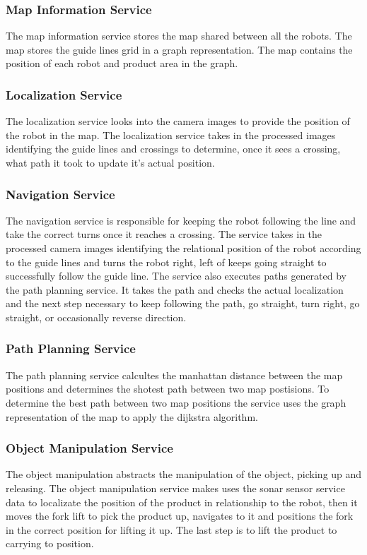 \subsubsection*{Map Information Service}
The map information service stores the map shared between all the robots. The map stores the guide lines grid in a graph representation. The map contains the position of each robot and product area in the graph.

\subsubsection*{Localization Service}
The localization service looks into the camera images to provide the position of the robot in the map. The localization service takes in the processed images identifying the guide lines and crossings to determine, once it sees a crossing, what path it took to update it's actual position.

\subsubsection*{Navigation Service}
The navigation service is responsible for keeping the robot following the line and take the correct turns once it reaches a crossing. The service takes in the processed camera images identifying the relational position of the robot according to the guide lines and turns the robot right, left of keeps going straight to successfully follow the guide line. The service also executes paths generated by the path planning service. It takes the path and checks the actual localization and the next step necessary to keep following the path, go straight, turn right, go straight, or occasionally reverse direction.

\subsubsection*{Path Planning Service}
The path planning service calcultes the manhattan distance between the map positions and determines the shotest path between two map postisions. To determine the best path between two map positions the service uses the graph representation of the map to apply the dijkstra algorithm.

\subsubsection*{Object Manipulation Service}
The object manipulation abstracts the manipulation of the object, picking up and releasing. The object manipulation service makes uses the sonar sensor service data to localizate the position of the product in relationship to the robot, then it moves the fork lift to pick the product up, navigates to it and positions the fork in the correct position for lifting it up. The last step is to lift the product to carrying to position. 
